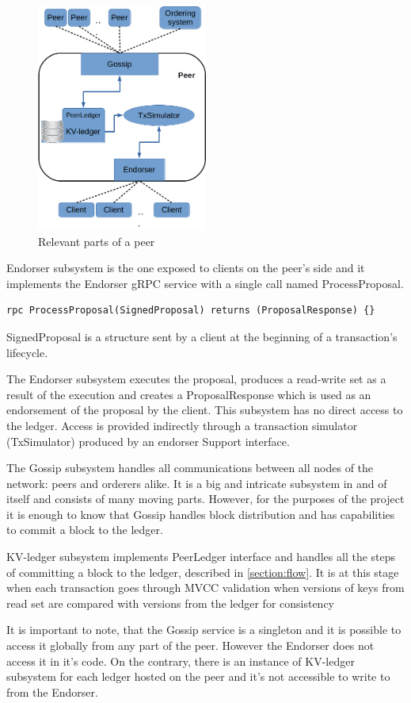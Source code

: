 \begin{figure}[hp]
\begin{center}
\includegraphics[width=0.5\textwidth]{figures/peer}
\end{center}
\caption{Relevant parts of a peer}
\label{fig:peer}
\end{figure}

Endorser subsystem is the one exposed to clients on the peer's side and it implements the Endorser gRPC service with a single call named ProcessProposal.
\begin{lstlisting}
rpc ProcessProposal(SignedProposal) returns (ProposalResponse) {}
\end{lstlisting}
SignedProposal is a structure sent by a client at the beginning of a transaction's lifecycle.

The Endorser subsystem executes the proposal, produces a read-write set as a result of the execution and creates a ProposalResponse which is used as an endorsement of the proposal by the client.  This subsystem has no direct access to the ledger. Access is provided indirectly through a transaction simulator (TxSimulator) produced by an endorser Support interface.

The Gossip subsystem handles all communications between all nodes of the network: peers and orderers alike. It is a big and intricate subsystem in and of itself and consists of many moving parts. However, for the purposes of the project it is enough to know that Gossip handles block distribution and has capabilities to commit a block to the ledger.

KV-ledger subsystem implements PeerLedger interface and handles all the steps of committing a block to the ledger, described in \ref{section:flow}. It is at this stage when each transaction goes through MVCC validation when versions of keys from read set are compared with versions from the ledger for consistency

It is important to note, that the Gossip service is a singleton and it is possible to access it globally from any part of the peer. However the Endorser does not access it in it's code. On the contrary, there is an instance of KV-ledger subsystem for each ledger hosted on the peer and it's not accessible to write to from the Endorser.
